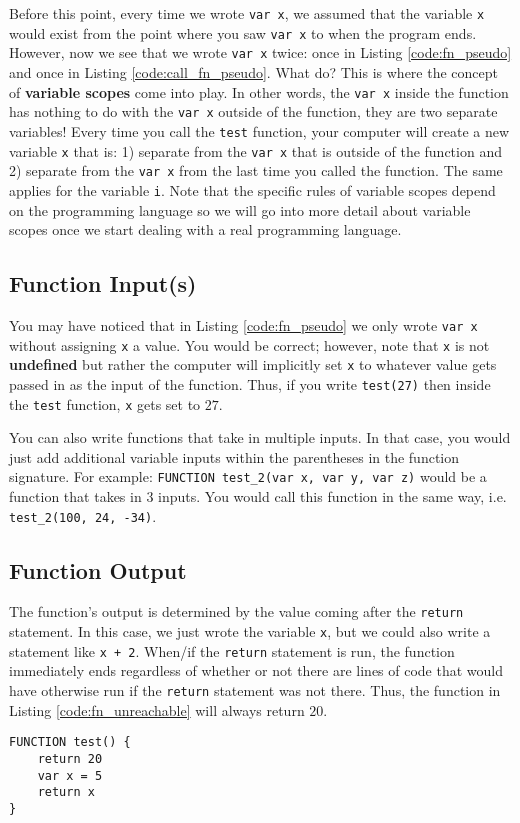 \documentclass{article}
\begin{document}
Before this point, every time we wrote \lstinline{var x}, we assumed that the variable \lstinline{x} would exist from the point where you saw \lstinline{var x} to when the program ends.
However, now we see that we wrote \lstinline{var x} twice: once in Listing \ref{code:fn_pseudo} and once in Listing \ref{code:call_fn_pseudo}.
What do?
This is where the concept of \textbf{variable scopes} come into play.
In other words, the \lstinline{var x} inside the function has nothing to do with the \lstinline{var x} outside of the function, they are two separate variables!
Every time you call the \lstinline{test} function, your computer will create a new variable \lstinline{x} that is: 1) separate from the \lstinline{var x} that is outside of the function and 2) separate from the \lstinline{var x} from the last time you called the function.
The same applies for the variable \lstinline{i}.
Note that the specific rules of variable scopes depend on the programming language so we will go into more detail about variable scopes once we start dealing with a real programming language.

\subsection{Function Input(s)}

You may have noticed that in Listing \ref{code:fn_pseudo} we only wrote \lstinline{var x} without assigning \lstinline{x} a value.
You would be correct; however, note that \lstinline{x} is not \textbf{undefined} but rather the computer will implicitly set \lstinline{x} to whatever value gets passed in as the input of the function.
Thus, if you write \lstinline{test(27)} then inside the \lstinline{test} function, \lstinline{x} gets set to $27$.

You can also write functions that take in multiple inputs.
In that case, you would just add additional variable inputs within the parentheses in the function signature.
For example: \lstinline{FUNCTION test_2(var x, var y, var z)} would be a function that takes in $3$ inputs.
You would call this function in the same way, i.e. \lstinline{test_2(100, 24, -34)}.

\subsection{Function Output}

The function's output is determined by the value coming after the \lstinline{return} statement.
In this case, we just wrote the variable \lstinline{x}, but we could also write a statement like \lstinline{x + 2}.
When/if the \lstinline{return} statement is run, the function immediately ends regardless of whether or not there are lines of code that would have otherwise run if the \lstinline{return} statement was not there.
Thus, the function in Listing \ref{code:fn_unreachable} will always return $20$.
\begin{lstlisting}[caption={Unreachable Code.}, label={code:fn_unreachable}]
FUNCTION test() {
    return 20
    var x = 5
    return x
}
\end{lstlisting}
\end{document}
